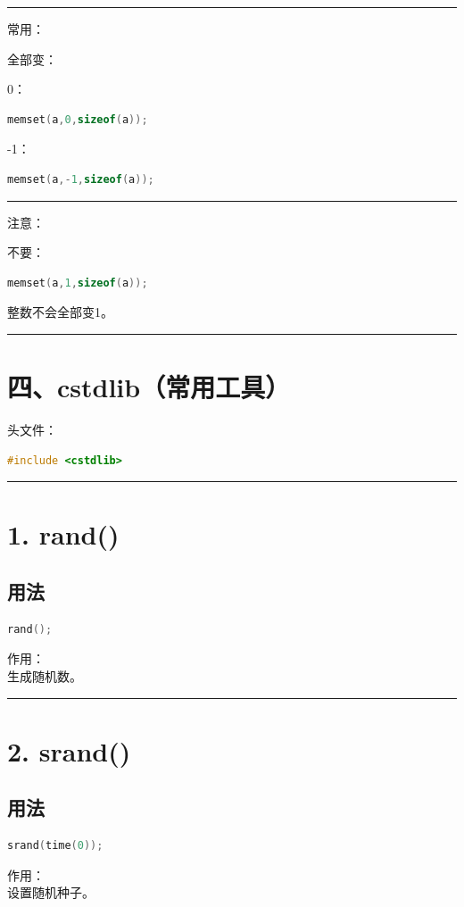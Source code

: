 \documentclass[10pt,twocolumn]{extarticle}
\begin{document}
\noindent\rule{\linewidth}{0.4pt}

常用：

全部变：

0：
\begin{lstlisting}[language=C++]
memset(a,0,sizeof(a));
\end{lstlisting}

-1：
\begin{lstlisting}[language=C++]
memset(a,-1,sizeof(a));
\end{lstlisting}

\noindent\rule{\linewidth}{0.4pt}

注意：

不要：
\begin{lstlisting}[language=C++]
memset(a,1,sizeof(a));
\end{lstlisting}
整数不会全部变1。

\noindent\rule{\linewidth}{0.4pt}

\section{四、cstdlib（常用工具）}

头文件：
\begin{lstlisting}[language=C++]
#include <cstdlib>
\end{lstlisting}

\noindent\rule{\linewidth}{0.4pt}

\section{1. rand()}

\subsection{用法}
\begin{lstlisting}[language=C++]
rand();
\end{lstlisting}
作用：\\
生成随机数。

\noindent\rule{\linewidth}{0.4pt}

\section{2. srand()}

\subsection{用法}
\begin{lstlisting}[language=C++]
srand(time(0));
\end{lstlisting}
作用：\\
设置随机种子。
\end{document}
